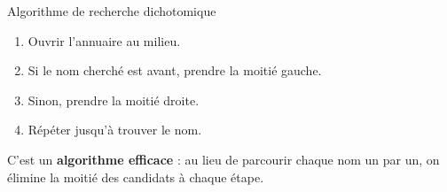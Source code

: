 \begin{UPSTIinfor}{Algorithme de recherche dichotomique}
	\begin{enumerate}
		\item Ouvrir l’annuaire au milieu.
		\item Si le nom cherché est avant, prendre la moitié gauche.
		\item Sinon, prendre la moitié droite.
		\item Répéter jusqu’à trouver le nom.
	\end{enumerate}
\end{UPSTIinfor}

C’est un \textbf{algorithme efficace} : au lieu de parcourir chaque nom un par un, on élimine la moitié des candidats à chaque étape.